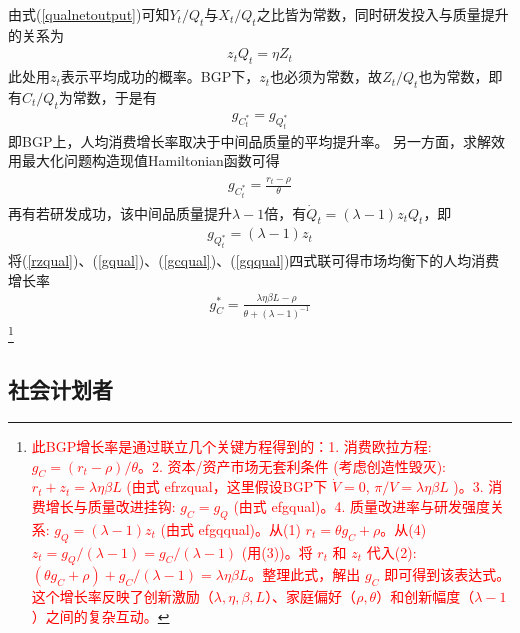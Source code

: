 \documentclass[cn,normal,11pt,black]{elegantnote}
\begin{document}
    由式(\ref{qualnetoutput})可知$Y_t/Q_t$与$X_t/Q_t$之比皆为常数，同时研发投入与质量提升的关系为
    \begin{align}
        z_t Q_t = \eta Z_t
    \end{align}
    此处用$z_t$表示平均成功的概率。BGP下，$z_t$也必须为常数，故$Z_t/Q_t$也为常数，即有$C_t/Q_t$为常数，于是有
    \begin{align}\label{gqual}
        g_{C^*_t} = g_{Q^*_t} 
    \end{align}
    即BGP上，人均消费增长率取决于中间品质量的平均提升率。
    另一方面，求解效用最大化问题构造现值Hamiltonian函数可得
    \begin{align}\label{gcqual}
    \begin{aligned}
        g_{C^*_t} = \frac{r_t -  \rho}{\theta} 
    \end{aligned}
    \end{align}
    再有若研发成功，该中间品质量提升$\lambda -1$倍，有$\dot{Q}_t=(\lambda-1) z_t Q_t$，即
    \begin{align}\label{gqqual}
        g_{Q^*_t} = (\lambda -1)z_t 
    \end{align}
    将(\ref{rzqual})、(\ref{gqual})、(\ref{gcqual})、(\ref{gqqual})四式联可得市场均衡下的人均消费增长率
    \begin{align}\label{qualgcmkt}
        g_C^{*}=\frac{\lambda \eta \beta L-\rho}{\theta+(\lambda-1)^{-1}}
    \end{align}\footnote{\textcolor{red}{此BGP增长率是通过联立几个关键方程得到的：1. 消费欧拉方程: $g_C = (r_t - \rho)/\theta$。2. 资本/资产市场无套利条件 (考虑创造性毁灭): $r_t + z_t = \lambda \eta \beta L$ (由式 ef{rzqual}，这里假设BGP下 $\dot{V}=0$, $\pi/V = \lambda \eta \beta L$ )。3. 消费增长与质量改进挂钩: $g_C = g_Q$ (由式 ef{gqual})。4. 质量改进率与研发强度关系: $g_Q = (\lambda-1)z_t$ (由式 ef{gqqual})。从(1) $r_t = \theta g_C + \rho$。从(4) $z_t = g_Q/(\lambda-1) = g_C/(\lambda-1)$ (用(3))。将 $r_t$ 和 $z_t$ 代入(2): $(\theta g_C + \rho) + g_C/(\lambda-1) = \lambda \eta \beta L$。整理此式，解出 $g_C$ 即可得到该表达式。这个增长率反映了创新激励（$\lambda, \eta, \beta, L$）、家庭偏好（$\rho, \theta$）和创新幅度（$\lambda-1$）之间的复杂互动。}}
    

\subsection{社会计划者}
\end{document}
